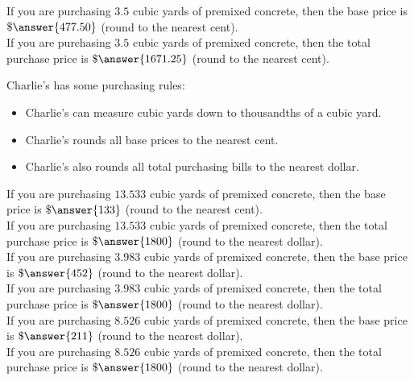 \documentclass{ximera}
\begin{document}
\begin{exercise}

If you are purchasing $3.5$ cubic yards of premixed concrete, then the base price is $\$\answer{477.50}$ (round to the nearest cent). \\

If you are purchasing $3.5$ cubic yards of premixed concrete, then the total purchase price is $\$\answer{1671.25}$ (round to the nearest cent). \\

\end{exercise}






Charlie's has some purchasing rules:
\begin{itemize}
\item Charlie's can measure cubic yards down to thousandths of a cubic yard. 
\item Charlie's rounds all base prices to the nearest cent.
\item Charlie's also rounds all total purchasing bills to the nearest dollar.
\end{itemize}






\begin{exercise}

If you are purchasing $13.533$ cubic yards of premixed concrete, then the base price is $\$\answer{133}$ (round to the nearest cent). \\

If you are purchasing $13.533$ cubic yards of premixed concrete, then the total purchase price is $\$\answer{1800}$ (round to the nearest dollar). \\



If you are purchasing $3.983$ cubic yards of premixed concrete, then the base price is $\$\answer{452}$ (round to the nearest dollar). \\

If you are purchasing $3.983$ cubic yards of premixed concrete, then the total purchase price is $\$\answer{1800}$ (round to the nearest dollar). \\



If you are purchasing $8.526$ cubic yards of premixed concrete, then the base price is $\$\answer{211}$ (round to the nearest dollar). \\

If you are purchasing $8.526$ cubic yards of premixed concrete, then the total purchase price is $\$\answer{1800}$ (round to the nearest dollar). \\




\end{exercise}
\end{document}
